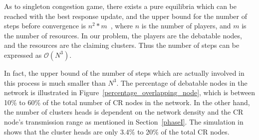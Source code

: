 \documentclass[10pt,journal,compsoc]{IEEEtran}
\theoremstyle{mytheoremstyle}
\theoremstyle{mytheoremstyle}
\theoremstyle{mytheoremstyle}
\begin{document}
As to singleton congestion game, there exists a pure equilibria which can be reached with the best response update, and the upper bound for the number of steps before convergence is $n^2*m$~\cite{Ackermann06purenash}, where $n$ is the number of players, and $m$ is the number of resources.
In our problem, the players are the debatable nodes, and the resources are the claiming clusters.
Thus the number of steps can be expressed as $\mathcal{O}(N^3)$.

In fact, the upper bound of the number of steps which are actually involved in this process is much smaller than $N^3$.%
The percentage of debatable nodes in the network is illustrated in Figure~\ref{percentage_overlapping_node}, which is between 10\% to 60\% of the total number of CR nodes in the network.
In the other hand, the number of clusters heads is dependent on the network density and the CR node's transmission range as mentioned in Section~\ref{phaseI}.
The simulation in \cite{robust_clustering_arxiv} shows that the cluster heads are only 3.4\% to 20\% of the total CR nodes.



\end{document}
